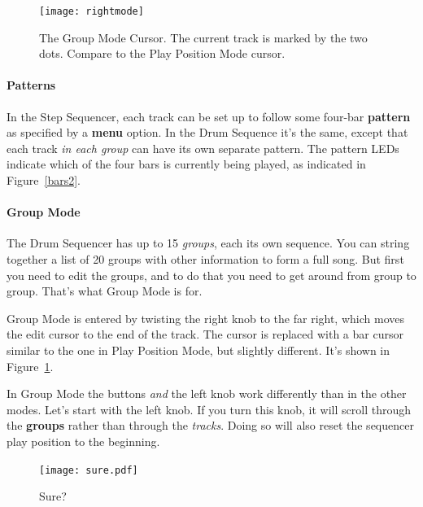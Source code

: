 \documentclass{article}
\begin{document}
\begin{figure}
\vspace{-1em}
\hspace{\fill}\texttt{[image: rightmode]}\hspace{\fill}
\caption{\small The Group Mode Cursor.  The current track is marked by the two dots.  Compare to the Play Position Mode cursor.}
\vspace{-2em}
\label{groupmode}
\end{figure}



\paragraph{Patterns}

In the Step Sequencer, each track can be set up to follow some four-bar {\bf pattern} as specified by a {\bf menu} option.  In the Drum Sequence it's the same, except that each track {\it in each group} can have its own separate pattern.   The pattern LEDs indicate which of the four bars is currently being played, as indicated in Figure~\ref{bars2}.

\paragraph{Group Mode}  The Drum Sequencer has up to 15 {\it groups}, each its own sequence.  You can string together a list of 20 groups with other information to form a full song.  But first you need to edit the groups, and to do that you need to get around from group to group.  That's what Group Mode is for.

Group Mode is entered by twisting the right knob to the far right, which moves the edit cursor to the end of the track.  The cursor is replaced with a bar cursor similar to the one in Play Position Mode, but slightly different.  It's shown in Figure~\ref{groupmode}.

In Group Mode the buttons {\it and} the left knob work differently than in the other modes.  Let's start with the left knob.  If you turn this knob, it will scroll through the {\bf groups} rather than through the {\it tracks}.  Doing so will also reset the sequencer play position to the beginning.  %


\begin{figure}
\vspace{-1em}
\texttt{[image: sure.pdf]}
\caption{Sure?}
\label{exit}
\vspace{-1em}
\end{figure}
\end{document}
